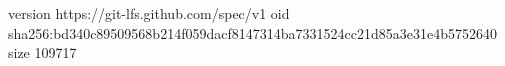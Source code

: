 version https://git-lfs.github.com/spec/v1
oid sha256:bd340c89509568b214f059dacf8147314ba7331524cc21d85a3e31e4b5752640
size 109717
